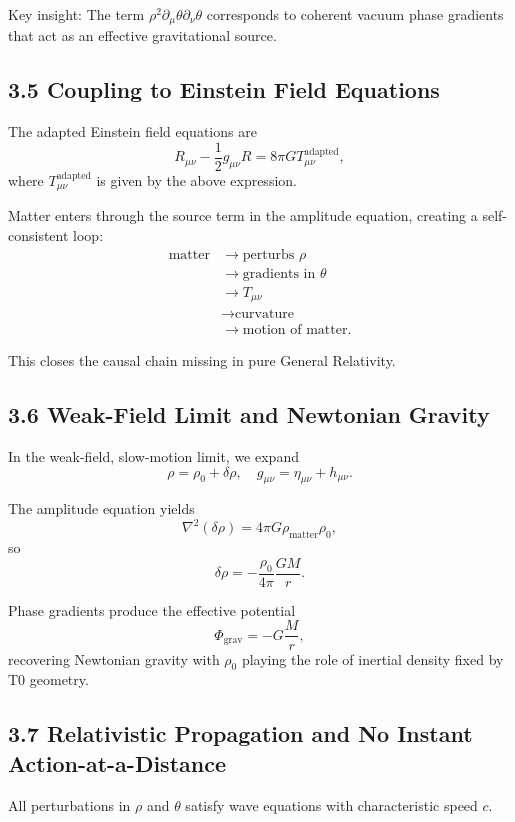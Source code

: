 	Key insight: The term $\rho^2 \partial_\mu \theta \partial_\nu \theta$ corresponds to coherent vacuum phase gradients that act as an effective gravitational source.
	
	\subsection{3.5 Coupling to Einstein Field Equations}
	
	The adapted Einstein field equations are
	\[
	R_{\mu\nu} - \frac{1}{2} g_{\mu\nu} R = 8\pi G T_{\mu\nu}^{\text{adapted}},
	\]
	where $T_{\mu\nu}^{\text{adapted}}$ is given by the above expression.
	
	Matter enters through the source term in the amplitude equation, creating a self-consistent loop:
\[
\begin{aligned}
	\text{matter} &\to \text{perturbs } \rho \\
	&\to \text{gradients in } \theta \\
	&\to T_{\mu\nu} \\
	&\to \text{curvature} \\
	&\to \text{motion of matter}.
\end{aligned}
\]
	
	This closes the causal chain missing in pure General Relativity.
	
	\subsection{3.6 Weak-Field Limit and Newtonian Gravity}
	
	In the weak-field, slow-motion limit, we expand
	\[
	\rho = \rho_0 + \delta \rho, \quad g_{\mu\nu} = \eta_{\mu\nu} + h_{\mu\nu}.
	\]
	
	The amplitude equation yields
	\[
	\nabla^2 (\delta \rho) = 4\pi G \rho_{\text{matter}} \rho_0,
	\]
	so
	\[
	\delta \rho = -\frac{\rho_0}{4\pi} \frac{GM}{r}.
	\]
	
	Phase gradients produce the effective potential
	\[
	\Phi_{\text{grav}} = -G \frac{M}{r},
	\]
	recovering Newtonian gravity with $\rho_0$ playing the role of inertial density fixed by T0 geometry.
	
	\subsection{3.7 Relativistic Propagation and No Instant Action-at-a-Distance}
	
	All perturbations in $\rho$ and $\theta$ satisfy wave equations with characteristic speed $c$.
	
